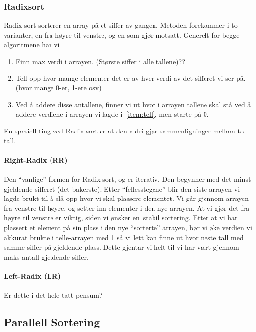 \subsubsection{\color{red}Radixsort}\label{radixsort}
Radix sort sorterer en array på et siffer av gangen.
Metoden forekommer i to varianter, en fra høyre til venstre, og en som gjør
motsatt. Generelt for begge algoritmene har vi
\begin{enumerate}
\item Finn max verdi i arrayen. (Største siffer i alle tallene)\color{red}??
\item\label{item:tell} Tell opp hvor mange elementer det er av hver verdi av det sifferet vi ser
  på. (hvor mange 0-er, 1-ere osv)
\item Ved å addere disse antallene, finner vi ut hvor i arrayen tallene skal stå
  ved å addere verdiene i arrayen vi lagde i~\ref{item:tell}, men starte på 0.
\end{enumerate}
En spesiell ting ved Radix sort er at den aldri gjør sammenligninger mellom to
tall.

\paragraph{\color{red}Right-Radix (RR)}
Den ``vanlige'' formen for Radix-sort, og er iterativ.
Den begynner med det minst gjeldende sifferet (det bakerste). Etter
``fellesstegene'' blir den siste arrayen vi lagde brukt til å slå opp hvor vi
skal plassere elementet. Vi går gjennom arrayen fra venstre til høyre, og setter
inn elementer i den nye arrayen. At vi gjør det fra høyre til venstre er viktig,
siden vi ønsker en~\hyperref[stabil]{stabil} sortering. Etter at vi har plassert
et element på sin plass i den nye ``sorterte'' arrayen, bør vi øke verdien vi
akkurat brukte i telle-arrayen med 1 så vi lett kan finne ut hvor neste tall med
samme siffer på gjeldende plass. Dette gjentar vi helt til vi har vært gjennom
maks antall gjeldende siffer.



\paragraph{\color{red}Left-Radix (LR)}
\color{red}Er dette i det hele tatt pensum?


\subsection{\color{red}Parallell Sortering}

